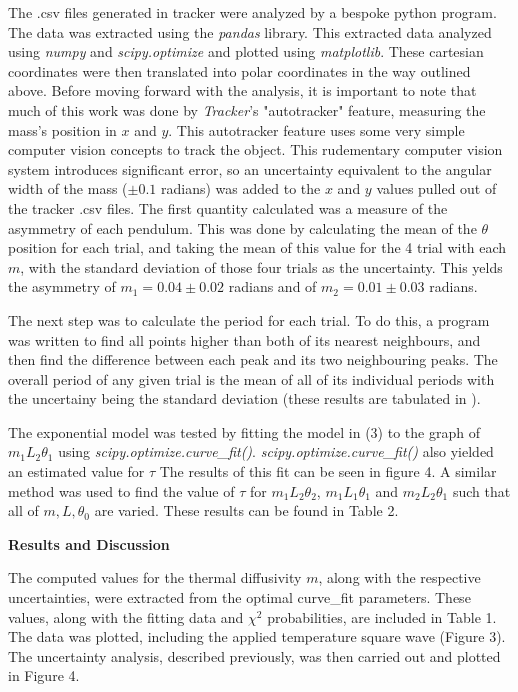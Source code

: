\documentclass[11pt]{article}
\begin{document}
\begin{multicols}{2}
    The .csv files generated in tracker were analyzed by a bespoke python program. The data was extracted using the \textit{pandas} library. This extracted data analyzed using \textit{numpy} and \textit{scipy.optimize} and plotted using \textit{matplotlib}. These cartesian coordinates were then translated into polar coordinates in the way outlined above. Before moving forward with the analysis, it is important to note that much of this work was done by \textit{Tracker}'s "autotracker" feature, measuring the mass's position in $x$ and $y$. This autotracker feature uses some very simple computer vision concepts to track the object. This rudementary computer vision system introduces significant error, so an uncertainty equivalent to the angular width of the mass ($\pm 0.1$ radians) was added to the $x$ and $y$ values pulled out of the tracker .csv files. The first quantity calculated was a measure of the asymmetry of each pendulum. This was done by calculating the mean of the $\theta$ position for each trial, and taking the mean of this value for the 4 trial with each $m$, with the standard deviation of those four trials as the uncertainty. This yelds the asymmetry of $m_1 = 0.04 \pm 0.02$ radians and of $m_2 = 0.01 \pm 0.03$ radians. 

    The next step was to calculate the period for each trial. To do this, a program was written to find all points higher than both of its nearest neighbours, and then find the difference between each peak and its two neighbouring peaks. The overall period of any given trial is the mean of all of its individual periods with the uncertainy being the standard deviation (these results are tabulated in \label{periodTable}). 

    The exponential model was tested by fitting the model in (3) to the graph of $m_1 L_2 \theta_1$ using \textit{scipy.optimize.curve\_fit()}. \textit{scipy.optimize.curve\_fit()} also yielded an estimated value for $\tau$ The results of this fit can be seen in figure 4. A similar method was used to find the value of $\tau$ for $m_1 L_2 \theta_2$, $m_1 L_1 \theta_1$ and $m_2 L_2 \theta_1$ such that all of $m, L, \theta_0$ are varied. These results can be found in Table 2.

    \vspace{10pt}

     \selectfont \textbf{Results and Discussion}
    
     \selectfont The computed values for the thermal diffusivity $m$, along with the respective uncertainties, were extracted from the optimal curve\_fit parameters. These values, along with the fitting data and $\chi^2$ probabilities, are included in Table 1. The data was plotted, including the applied temperature square wave (Figure 3). The uncertainty analysis, described previously, was then carried out and plotted in Figure 4.


\end{multicols}
\end{document}
